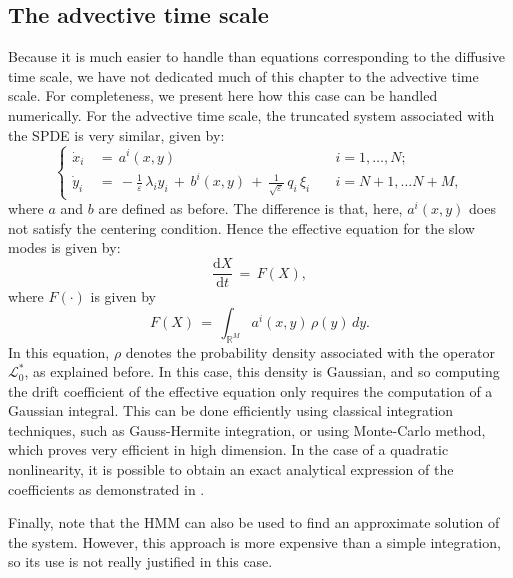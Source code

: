 \subsection{The advective time scale}
\label{sec:the_advective_time_scale}
Because it is much easier to handle than equations corresponding to the
diffusive time scale, we have not dedicated much of this chapter to the
advective time scale. For completeness, we present here how this case can be
handled numerically. For the advective time scale, the truncated system
associated with the SPDE is very similar, given by:
\begin{equation}
    \left\{\begin{aligned} 
            \dot x_{i}\,&=\,a^{i}(x,y)
            & \quad i = 1,{\dots}, N;  \\ \dot y_{i}\,&=\,-\frac 1 {{\varepsilon}}\, {\lambda}_{i}
            y_{i}\,+\,b^{i}(x,y)\,+\,\frac 1{\sqrt {\varepsilon}}\,q_{i}\,{\xi}_{i} &
            \quad i = N+1, {\dots}N+M,
        \end{aligned} \right. 
\end{equation}
where $a$ and $b$ are defined as before. The difference is that, here,
$a^i(x,y)$ does not satisfy the centering condition. Hence the effective
equation for the slow modes is given by:
$$
\frac{\mathrm d X}{\mathrm d t}\,=\, F(X),
$$
where $F({\cdot})$ is given by
$$
F(X) \,=\, \int_{\mathbb R^M} a^i(x,y) \, {\rho}(y)\,dy.
$$
In this equation, ${\rho}$ denotes the probability density associated with the
operator $\mathcal L_0^*$, as explained before. In this case, this density is
Gaussian, and so computing the drift coefficient of the effective equation only
requires the computation of a Gaussian integral. This can be done efficiently
using classical integration techniques, such as Gauss-Hermite integration, or
using Monte-Carlo method, which proves very efficient in high dimension. In the case of 
a quadratic nonlinearity, it is possible to obtain an exact analytical
expression of the coefficients as demonstrated in \cite{abdulle2012numerical}.

Finally, note that the HMM can also be used to find an approximate solution of
the system. However, this approach is more expensive than a simple integration, so its 
use is not really justified in this case. 
